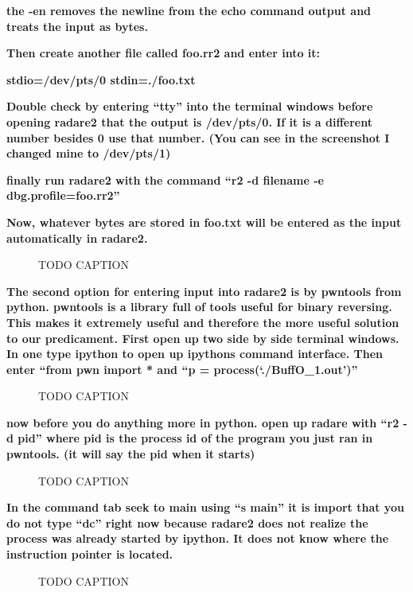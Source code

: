 \documentclass[letterpaper]{article}
\newcommand{\sitfig}[3]{
\begin{figure}[H]
\centering
\makebox[\textwidth][c]{
#2
}
\caption{#3}
\label{#1}
\end{figure}
}
\newcommand{\sitgfx}[4][scale=1.0]{
\sitfig{#3}{\texttt{[image: \#2]}}{#4}
}
\begin{document}
\textbf{the -en removes the newline from the echo command output and treats the input as bytes.}

\textbf{Then create another file called foo.rr2 and enter into it:}

\textbf{stdio=/dev/pts/0\newline
stdin=./foo.txt}

\textbf{Double check by entering ``tty'' into the terminal windows before opening radare2 that the output is /dev/pts/0.
If it is a different number besides 0 use that number. (You can see in the screenshot I changed mine to /dev/pts/1)}

\textbf{finally run radare2 with the command ``r2 -d filename -e dbg.profile=foo.rr2''}

\textbf{Now, whatever bytes are stored in foo.txt will be entered as the input automatically in radare2.}

  
\sitgfx[width=5.8335in,height=3.6457in]{FINALWORKINGDOCFORMERLYPRECURSOR-img097.png}{fig:unk}{TODO CAPTION}
 \textbf{ }

\textbf{The second option for entering input into radare2 is by pwntools from python. pwntools is a library full of
tools useful for binary reversing. This makes it extremely useful and therefore the more useful solution to our
predicament.\newline
First open up two side by side terminal windows. In one type ipython to open up ipythons command interface. Then enter
``from pwn import *{\textquotedbl} and ``p = process(`./BuffO\_1.out')''}

  
\sitgfx[width=5.8335in,height=3.6457in]{FINALWORKINGDOCFORMERLYPRECURSOR-img098.png}{fig:unk}{TODO CAPTION}
 

\textbf{now before you do anything more in python. open up radare with ``r2 -d pid'' where pid is the process id of the
program you just ran in pwntools. (it will say the pid when it starts)}

  
\sitgfx[width=5.8335in,height=3.6457in]{FINALWORKINGDOCFORMERLYPRECURSOR-img099.png}{fig:unk}{TODO CAPTION}
 

\textbf{In the command tab seek to main using ``s main'' it is import that you do not type ``dc'' right now because
radare2 does not realize the process was already started by ipython. It does not know where the instruction pointer is
located.}

  
\sitgfx[width=5.8335in,height=3.6457in]{FINALWORKINGDOCFORMERLYPRECURSOR-img100.png}{fig:unk}{TODO CAPTION}
 
\end{document}
